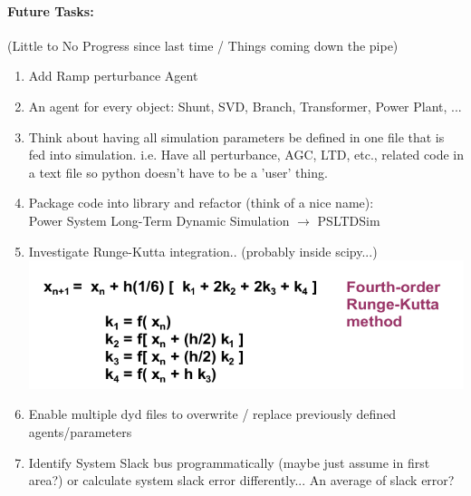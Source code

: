 \documentclass[12pt]{article}
\begin{document}
\paragraph{Future Tasks:}(Little to No Progress since last time / Things coming down the pipe)
	\begin{enumerate}
		\item Add Ramp perturbance Agent
		
		\item An agent for every object: Shunt, SVD, Branch, Transformer, Power Plant, ...
		
		\item Think about having all simulation parameters be defined in one file that is fed into simulation. i.e. Have all perturbance, AGC, LTD, etc., related code in a text file so python doesn't have to be a 'user' thing.
		
		\item Package code into library and refactor (think of a nice name):\\
		Power System Long-Term Dynamic Simulation $\rightarrow$ PSLTDSim
		
		\item Investigate Runge-Kutta integration.. (probably inside scipy...)\\
		\includegraphics[width=.7\linewidth]{rk4}
		
		\item Enable multiple dyd files to overwrite / replace previously defined agents/parameters
		
		\item Identify System Slack bus programmatically (maybe just assume in first area?)
		\subitem or calculate system slack error differently... An average of slack error?
		
		
	\end{enumerate}
\end{document}
